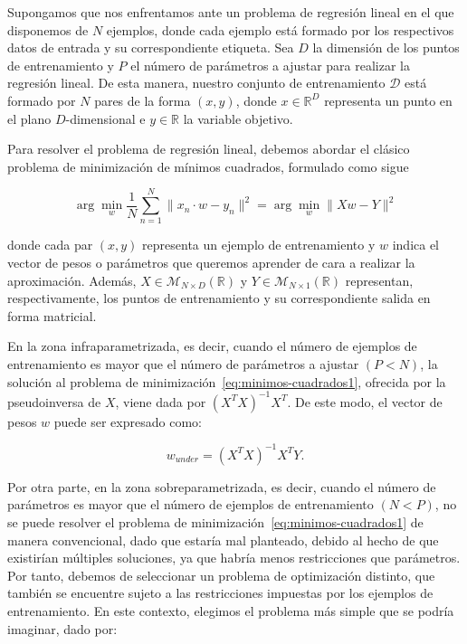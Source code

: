 Supongamos que nos enfrentamos ante un problema de regresión lineal en el que disponemos de $N$ ejemplos, donde cada ejemplo está formado por los respectivos datos de entrada y su correspondiente etiqueta. Sea $D$ la dimensión de los puntos de entrenamiento y $P$ el número de parámetros a ajustar para realizar la regresión lineal. De esta manera, nuestro conjunto de entrenamiento $\mathcal{D}$ está formado por $N$ pares de la forma $(x,y)$, donde $x \in \mathbb{R}^{D}$ representa un punto en el plano $D$-dimensional e $y \in \mathbb{R}$ la variable objetivo.\newline

Para resolver el problema de regresión lineal, debemos abordar el clásico problema de minimización de mínimos cuadrados, formulado como sigue

\begin{equation}\label{eq:minimos-cuadrados1}
    \arg\min_{w} \frac{1}{N}\sum_{n=1}^{N}\| x_n \cdot w - y_n \|^{2} = \arg\min_{w}\| Xw - Y \|^{2}
\end{equation}

donde cada par $(x, y)$ representa un ejemplo de entrenamiento y $w$ indica el vector de pesos o parámetros que queremos aprender de cara a realizar la aproximación. Además, $X \in \mathcal{M}_{N \times D}(\mathbb{R})$ y $Y\in \mathcal{M}_{N \times 1}(\mathbb{R})$ representan, respectivamente, los puntos de entrenamiento y su correspondiente salida en forma matricial.\newline

En la zona infraparametrizada, es decir, cuando el número de ejemplos de entrenamiento es mayor que el número de parámetros a ajustar $(P < N)$, la solución al problema de minimización~\eqref{eq:minimos-cuadrados1}, ofrecida por la pseudoinversa de $X$, viene dada por ${(X^{T}X)}^{-1}X^{T}$. De este modo, el vector de pesos $w$ puede ser expresado como:

\begin{equation}
    w_{under} = {(X^{T}X)}^{-1}X^{T}Y.
\end{equation}\newline

Por otra parte, en la zona sobreparametrizada, es decir, cuando el número de parámetros es mayor que el número de ejemplos de entrenamiento $(N < P)$, no se puede resolver el problema de minimización~\eqref{eq:minimos-cuadrados1} de manera convencional, dado que estaría mal planteado, debido al hecho de que existirían múltiples soluciones, ya que habría menos restricciones que parámetros. Por tanto, debemos de seleccionar un problema de optimización distinto, que también se encuentre sujeto a las restricciones impuestas por los ejemplos de entrenamiento. En este contexto, elegimos el problema más simple que se podría imaginar, dado por:

